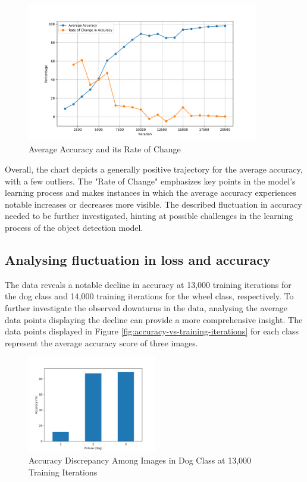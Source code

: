 \begin{figure}[h]
   \centering
   \includegraphics[width=0.9\textwidth]{../Data/accuracy-improvement-graph.png}
   \caption{Average Accuracy and its Rate of Change}
   \label{fig:accuracy-improvement}
\end{figure}

Overall, the chart depicts a generally positive trajectory for the average accuracy, with a few outliers. The "Rate of Change" emphasizes
key points in the model's learning process and makes instances in which the average accuracy experiences notable increases or decreases more
visible. The described fluctuation in accuracy needed to be further investigated, hinting at possible
challenges in the learning process of the object detection model. \\

\subsection{Analysing fluctuation in loss and accuracy}

The data reveals a notable decline in accuracy at 13,000 training iterations for the dog class and 14,000 training iterations for the wheel class, respectively. To further investigate the observed downturns in the data, analysing the average data points displaying the decline can provide a more comprehensive insight. The data points displayed in Figure \ref{fig:accuracy-vs-training-iterations} for each class represent the average accuracy score of three images. 
\newpage
\begin{figure}[h]
   \centering
   \includegraphics[width=0.5\textwidth]{../Data/dog-outliers.png}
   \caption{Accuracy Discrepancy Among Images in Dog Class at 13,000 Training Iterations}
   \label{fig:14000-dog}
\end{figure}

